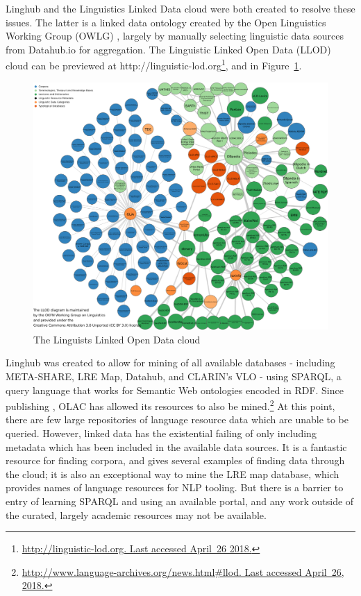 Linghub and the Linguistics Linked Data cloud were both created to resolve these issues. The latter is a linked data ontology created by the Open Linguistics Working Group (OWLG) \citep{chiarcos2011working, chiarcos2012open, chiarcos2013building, mccrae2016open}, largely by manually selecting linguistic data sources from Datahub.io for aggregation. The Linguistic Linked Open Data (LLOD) cloud \citep{chiarcos2012linking} can be previewed at http://linguistic-lod.org\footnote{\href{http://linguistic-lod.org/}{http://linguistic-lod.org. Last accessed April~26 2018.}}, and in Figure~\ref{fig:llod}.

\begin{figure}
 \centering
 \includegraphics[width=1\textwidth]{img/llod.png}
 \caption{The Linguists Linked Open Data cloud \citep{chiarcos2012linking}}
 \label{fig:llod}
\end{figure}

Linghub \citep{mccrae2015linghub, mccrae2015reconciling} was created to allow for mining of all available databases - including META-SHARE, LRE Map, Datahub, and CLARIN's VLO - using SPARQL, a query language that works for Semantic Web ontologies encoded in RDF. Since publishing \citet{mccrae2015linghub}, OLAC has allowed its resources to also be mined.\footnote{\href{http://www.language-archives.org/news.html\#llod}{http://www.language-archives.org/news.html\#llod. Last accessed April~26, 2018.}} At this point, there are few large repositories of language resource data which are unable to be queried. However, linked data has the existential failing of only including metadata which has been included in the available data sources. It is a fantastic resource for finding corpora, and \citet{mccrae2015linghub} gives several examples of finding data through the cloud;  it is also an exceptional way to mine the LRE map database, which provides names of language resources for NLP tooling. But there is a barrier to entry of learning SPARQL and using an available portal, and any work outside of the curated, largely academic resources may not be available.

